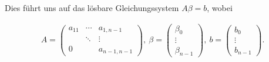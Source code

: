 \begin{solution}
Dies führt uns auf das lösbare Gleichungssystem $A \beta = b$, wobei

\begin{align*}
  A =
  \begin{pmatrix}
    a_{11} & \cdots & a_{1, n-1}   \\
           & \ddots & \vdots       \\
    0      &        & a_{n-1, n-1}
  \end{pmatrix}, \:
  \beta =
  \begin{pmatrix}
  \beta_0 \\
  \vdots  \\
  \beta_{n-1}
  \end{pmatrix}, \:
  b =
  \begin{pmatrix}
    b_0    \\
    \vdots \\
    b_{n-1}
  \end{pmatrix}.
\end{align*}

\end{solution}
